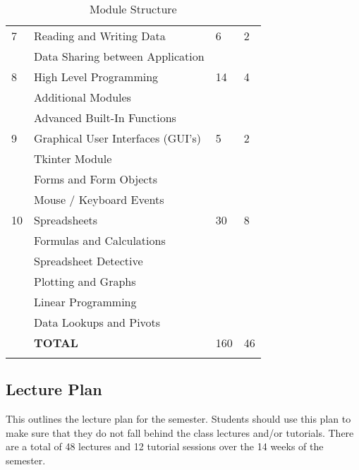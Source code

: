 \begin{longtable}{|p{2.0cm}|p{7.6cm}|p{2.0cm}|p{1.8cm}|}
             \hline
             7  & Reading and Writing Data                   &  6 & 2  \\
                & \qquad Data Sharing between Application    &    &    \\
             \hline
             8  & High Level Programming                     & 14 & 4  \\
                & \qquad Additional Modules                  &    &    \\
                & \qquad Advanced Built-In Functions         &    &    \\
             \hline
             9  & Graphical User Interfaces (GUI's)          &  5 & 2  \\
                & \qquad Tkinter Module                      &    &    \\
                & \qquad Forms and Form Objects              &    &    \\
                & \qquad Mouse / Keyboard Events             &    &    \\
             \hline
             10 & Spreadsheets                               & 30 & 8  \\
                & \qquad Formulas and Calculations           &    &    \\
                & \qquad Spreadsheet Detective               &    &    \\
                & \qquad Plotting and Graphs                 &    &    \\
                & \qquad Linear Programming                  &    &    \\
                & \qquad Data Lookups and Pivots             &    &    \\
             \hline
                & {\bf TOTAL}                                &160 & 46 \\
             \hline

             \caption[Module Structure]{Module Structure} \label{tab:study_comp} \\
        \end{longtable}

    \subsection{Lecture Plan}
        This outlines the lecture plan for the semester. Students should use
        this plan to make sure that they do not fall behind the class
        lectures and/or tutorials. There are a total of 48 lectures and 12
        tutorial sessions over the 14 weeks of the semester.

